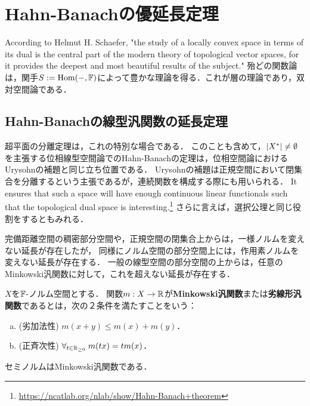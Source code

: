 \documentclass[uplatex,dvipdfmx]{jsreport}
\begin{document}
\section{Hahn-Banachの優延長定理}

\begin{tcolorbox}[colframe=ForestGreen, colback=ForestGreen!10!white,breakable,colbacktitle=ForestGreen!40!white,coltitle=black,fonttitle=\bfseries\sffamily,
title=]
    According to Helmut H. Schaefer, "the study of a locally convex space in terms of its dual is the central part of the modern theory of topological vector spaces, for it provides the deepest and most beautiful results of the subject."
    殆どの関数論は，関手$S:=\mathrm{Hom}(-,\mathbb{F})$によって豊かな理論を得る．これが層の理論であり，双対空間論である．
\end{tcolorbox}

\subsection{Hahn-Banachの線型汎関数の延長定理}

\begin{tcolorbox}[colframe=ForestGreen, colback=ForestGreen!10!white,breakable,colbacktitle=ForestGreen!40!white,coltitle=black,fonttitle=\bfseries\sffamily,
title=双対空間の元の存在]
    超平面の分離定理は，これの特別な場合である．
    このことも含めて，$\lvert X^*\rvert\ne\emptyset$を主張する位相線型空間論でのHahn-Banachの定理は，位相空間論におけるUrysohnの補題と同じ立ち位置である．
    Urysohnの補題は正規空間において閉集合を分離するという主張であるが，連続関数を構成する際にも用いられる．
    It ensures that such a space will have enough continuous linear functionals such that the topological dual space is interesting.\footnote{\url{https://ncatlab.org/nlab/show/Hahn-Banach+theorem}}
    さらに言えば，選択公理と同じ役割をするともみれる．
\end{tcolorbox}

\begin{tcolorbox}[colframe=ForestGreen, colback=ForestGreen!10!white,breakable,colbacktitle=ForestGreen!40!white,coltitle=black,fonttitle=\bfseries\sffamily,
title=]
    完備距離空間の稠密部分空間や，正規空間の閉集合上からは，一様ノルムを変えない延長が存在したが，
    同様にノルム空間の部分空間上には，作用素ノルムを変えない延長が存在する．
    一般の線型空間の部分空間の上からは，任意のMinkowski汎関数に対して，これを超えない延長が存在する．
\end{tcolorbox}

\begin{definition}
    $X$を$\mathbb{F}$-ノルム空間とする．
    関数$m:X\to\mathbb{R}$が\textbf{Minkowski汎関数}または\textbf{劣線形汎関数}であるとは，次の２条件を満たすことをいう：
    \begin{enumerate}[(a)]
        \item (劣加法性) $m(x+y)\le m(x)+m(y)$．
        \item (正斉次性) $\forall_{t\in\mathbb{R}_{\ge 0}}\;m(tx)=tm(x)$．
    \end{enumerate}
    セミノルムはMinkowski汎関数である．
\end{definition}
\end{document}
